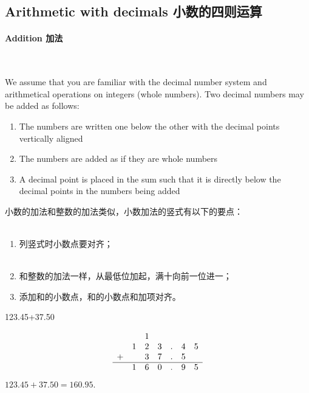 \subsection{Arithmetic with decimals 小数的四则运算}

\paragraph{Addition 加法} \ \ \\

\begin{paracol}{2}
We assume that you are familiar with the decimal number system and arithmetical operations on integers (whole numbers). Two decimal numbers may be added as follows:
\begin{enumerate}
\item The numbers are written one below the other with the decimal points vertically aligned
\item The numbers are added as if they are whole numbers
\item A decimal point is placed in the sum such that it is directly below the decimal points in the numbers being added
\end{enumerate}
\switchcolumn[1]
小数的加法和整数的加法类似，小数加法的竖式有以下的要点：\\ \\ 
\begin{enumerate}
\item 列竖式时小数点要对齐；\\ \\ 
\item 和整数的加法一样，从最低位加起，满十向前一位进一；
\item 添加和的小数点，和的小数点和加项对齐。
\end{enumerate}
\end{paracol}

\begin{example}
123.45+37.50
\end{example}
\begin{solution}

$$
\begin{array}{lcccccc}
&&1&&&&\\
&1&2&3&.&4&5\\
+&&3&7&.&5&\\
\hline
&1&6&0&.&9&5
\end{array}
$$
$123.45+37.50 = 160.95$.
\end{solution}

